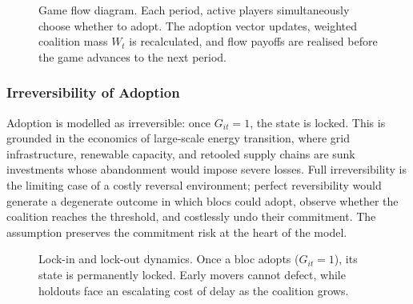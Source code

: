 \documentclass[10pt,a4paper]{article}
\begin{document}
\begin{figure}[htbp]
\centering
{}
\caption{Game flow diagram. Each period, active players simultaneously choose whether to adopt.
The adoption vector updates, weighted coalition mass $W_t$ is recalculated, and flow payoffs
are realised before the game advances to the next period.}
\label{fig:game_flow}
\end{figure}

\subsubsection*{Irreversibility of Adoption}

Adoption is modelled as irreversible: once $G_{it} = 1$, the state is locked. This is grounded in the economics of large-scale energy transition, where grid infrastructure, renewable capacity, and retooled supply chains are sunk investments whose abandonment would impose severe losses. Full irreversibility is the limiting case of a costly reversal environment; perfect reversibility would generate a degenerate outcome in which blocs could adopt, observe whether the coalition reaches the threshold, and costlessly undo their commitment. The assumption preserves the commitment risk at the heart of the model.

\begin{figure}[htbp]
\centering
{}
\caption{Lock-in and lock-out dynamics. Once a bloc adopts ($G_{it}=1$), its state is
permanently locked. Early movers cannot defect, while holdouts face an escalating cost of
delay as the coalition grows.}
\label{fig:lockin}
\end{figure}
\end{document}
